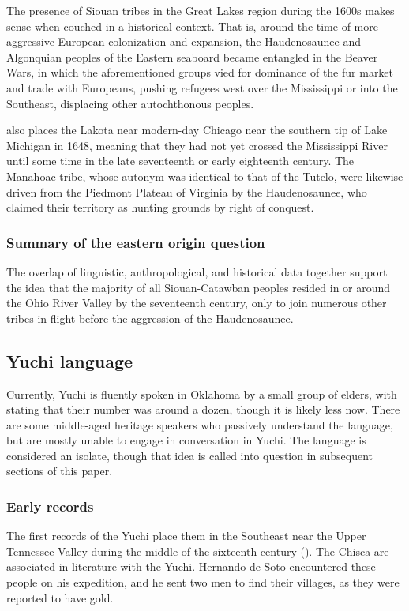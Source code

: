 \documentclass[output=paper]{LSP/langsci}
\begin{document}
The presence of Siouan tribes in the Great Lakes region during the 1600s makes sense when couched in a historical context. That is, around the time of more aggressive European colonization and expansion, the Haudenosaunee and Al\-gon\-qui\-an peoples of the Eastern seaboard became entangled in the Beaver Wars, in which the aforementioned groups vied for dominance of the fur market and trade with Europeans, pushing refugees west over the Mississippi or into the Southeast, displacing other autochthonous peoples. 

\citet{Jennings1990} also places the Lakota near modern-day Chicago near the southern tip of Lake Michigan in 1648, meaning that they had not yet crossed the Mississippi River until some time in the late seventeenth or early eighteenth century. The Manahoac tribe, whose autonym was identical to that of the Tutelo, were likewise driven from the Piedmont Plateau of Virginia by the Haudenosaunee, who claimed their territory as hunting grounds by right of conquest.

\subsubsection{Summary of the eastern origin question} 

The overlap of linguistic, anthropological, and historical data together support the idea that the majority of all Siouan-Catawban peoples resided in or around the Ohio River Valley by the seventeenth century, only to join numerous other tribes in flight before the aggression of the Haudenosaunee.

\subsection{Yuchi language}

Currently, Yuchi is fluently spoken in Oklahoma by a small group of elders, with \citet{Linn2000} stating that their number was around a dozen, though it is likely less now. There are some middle-aged heritage speakers who passively understand the language, but are mostly unable to engage in conversation in Yuchi. The language is considered an isolate, though that idea is called into question in subsequent sections of this paper.

\subsubsection{Early records} 

The first records of the Yuchi place them in the Southeast near the Upper Tennessee Valley during the middle of the sixteenth century (\citealt{Gatschet1885}). The Chisca are associated in literature with the Yuchi. Hernando de Soto encountered these people on his expedition, and he sent two men to find their villages, as they were reported to have gold. 
\end{document}
